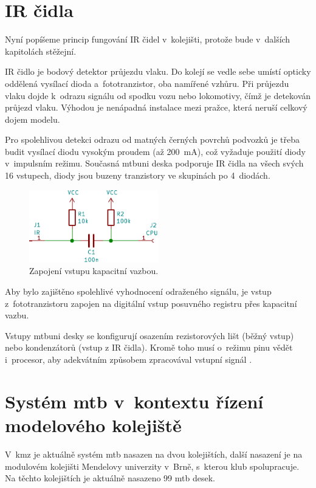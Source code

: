 \section{IR čidla} \label{sec:ir}

Nyní popíšeme princip fungování IR čidel v~kolejišti, protože bude v~dalších
kapitolách stěžejní.

IR čidlo je bodový detektor průjezdu vlaku. Do kolejí se vedle sebe umístí
opticky oddělená vysílací dioda a~fototranzistor, oba namířené vzhůru. Při
průjezdu vlaku dojde k~odrazu signálu od spodku vozu nebo lokomotivy, čímž je
detekován průjezd vlaku. Výhodou je nenápadná instalace mezi pražce, která
neruší celkový dojem modelu.

Pro spolehlivou detekci odrazu od matných černých povrchů podvozků je třeba
budit vysílací diodu vysokým proudem (až 200~mA), což vyžaduje použití
diody v~impulsním režimu. Současná \gls{mtbuni} deska podporuje IR čidla na
všech svých 16 vstupech, diody jsou buzeny tranzistory ve skupinách po
4~diodách.

\begin{figure}[ht]
\includegraphics[width=0.5\textwidth]{data/cap-bind/capacitive-bind-example.pdf}
\caption{Zapojení vstupu kapacitní vazbou.}
\label{fig:cap-bind}
\end{figure}

Aby bylo zajištěno spolehlivé vyhodnocení odraženého signálu, je vstup
z~fototranzistoru zapojen na digitální vstup posuvného registru přes kapacitní
vazbu.

Vstupy \gls{mtbuni} desky se konfigurují osazením rezistorových lišt (běžný
vstup) nebo kondenzátorů (vstup z IR čidla). Kromě toho musí o~režimu pinu
vědět i~procesor, aby adekvátním způsobem zpracovával vstupní signál
\cite{mtbuni22-specs}.


\section{Systém \gls{mtb} v~kontextu řízení modelového kolejiště} \label{sec:mtb_context}

V~\gls{kmz} je aktuálně systém \gls{mtb} nasazen na dvou kolejištích, další
nasazení je na modulovém kolejišti Mendelovy univerzity v~Brně, s~kterou klub
spolupracuje. Na těchto kolejištích je aktuálně nasazeno 99 \gls{mtb} desek.

